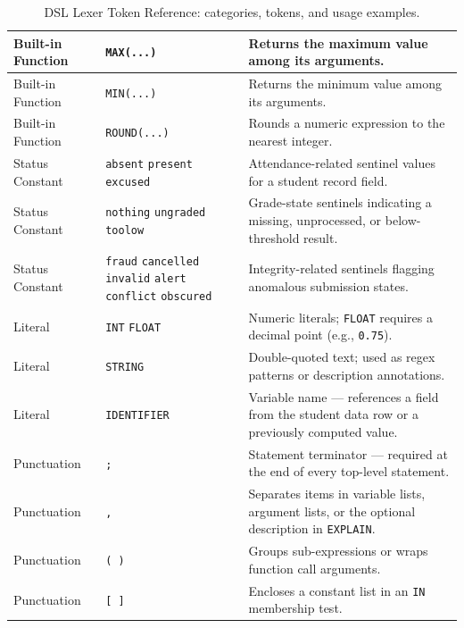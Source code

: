 \begin{table}[htbp]
\begin{tabular}{|>{\arraybackslash}m{}|>{\arraybackslash}m{}|>{\arraybackslash}m{}|}
\hline Built-in Function & \texttt{MAX(...)} & Returns the maximum value among its arguments. \\
\hline Built-in Function & \texttt{MIN(...)} & Returns the minimum value among its arguments. \\
\hline Built-in Function & \texttt{ROUND(...)} & Rounds a numeric expression to the nearest integer. \\
\hline Status Constant & \texttt{absent} \texttt{present} \texttt{excused} & Attendance-related sentinel values for a student record field. \\
\hline Status Constant & \texttt{nothing} \texttt{ungraded} \texttt{toolow} & Grade-state sentinels indicating a missing, unprocessed, or below-threshold result. \\
\hline Status Constant & \texttt{fraud} \texttt{cancelled} \texttt{invalid} \texttt{alert} \texttt{conflict} \texttt{obscured} & Integrity-related sentinels flagging anomalous submission states. \\
\hline Literal & \texttt{INT} \texttt{FLOAT} & Numeric literals; \texttt{FLOAT} requires a decimal point (e.g., \texttt{0.75}). \\
\hline Literal & \texttt{STRING} & Double-quoted text; used as regex patterns or description annotations. \\
\hline Literal & \texttt{IDENTIFIER} & Variable name — references a field from the student data row or a previously computed value. \\
\hline Punctuation & \texttt{;} & Statement terminator — required at the end of every top-level statement. \\
\hline Punctuation & \texttt{,} & Separates items in variable lists, argument lists, or the optional description in \texttt{EXPLAIN}. \\
\hline Punctuation & \texttt{( )} & Groups sub-expressions or wraps function call arguments. \\
\hline Punctuation & \texttt{[ ]} & Encloses a constant list in an \texttt{IN} membership test. \\
\hline
\end{tabular}
\caption{DSL Lexer Token Reference: categories, tokens, and usage examples.}
\label{dsllexertoken}
\end{table}
